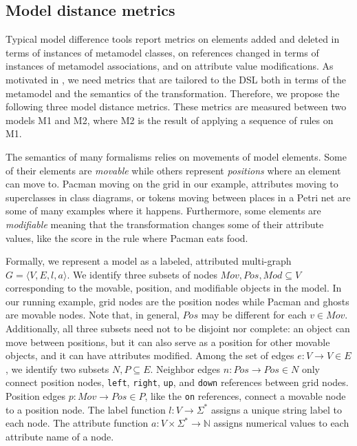 \subsection{Model distance metrics}

Typical model difference tools report metrics on elements added and deleted in terms of instances of metamodel classes, on references changed in terms of instances of metamodel associations, and on attribute value modifications.
As motivated in , we need metrics that are tailored to the DSL both in terms of the metamodel and the semantics of the transformation.
Therefore, we propose the following three model distance metrics.
These metrics are measured between two models M1 and M2, where M2 is the result of applying a sequence of rules on M1.

The semantics of many formalisms relies on movements of model elements.
Some of their elements are \emph{movable} while others represent \emph{positions} where an element can move to.
Pacman moving on the grid in our example, attributes moving to superclasses in class diagrams, or tokens moving between places in a Petri net are some of many examples where it happens.
Furthermore, some elements are \emph{modifiable} meaning that the transformation changes some of their attribute values, like the score in the rule where Pacman eats food.

Formally, we represent a model as a labeled, attributed multi-graph $G=\langle V,E,l,a \rangle$.
We identify three subsets of nodes $Mov,Pos,Mod \subseteq V$ corresponding to the movable, position, and modifiable objects in the model.
In our running example, grid nodes are the position nodes while Pacman and ghosts are movable nodes.
Note that, in general, $Pos$ may be different for each $v \in Mov$.
Additionally, all three subsets need not to be disjoint nor complete: an object can move between positions, but it can also serve as a position for other movable objects, and it can have attributes modified.
Among the set of edges $e:V \rightarrow V \in E$, we identify two subsets $N,P \subseteq E$.
Neighbor edges $n: Pos \rightarrow Pos \in N$ only connect position nodes, \eg \texttt{left}, \texttt{right}, \texttt{up}, and \texttt{down} references between grid nodes.
Position edges $p: Mov \rightarrow Pos \in P$, like the \texttt{on} references, connect a movable node to a position node.
The label function $l:V \rightarrow \Sigma^*$ assigns a unique string label to each node.
The attribute function $a:V \times \Sigma^* \rightarrow \mathbb{N}$ assigns numerical values to each attribute name of a node.

